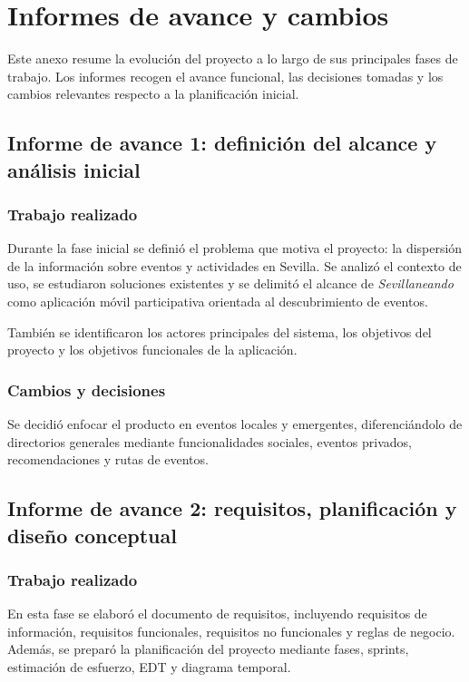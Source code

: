 \chapter{Informes de avance y cambios}

Este anexo resume la evolución del proyecto a lo largo de sus principales fases de trabajo. Los informes recogen el avance funcional, las decisiones tomadas y los cambios relevantes respecto a la planificación inicial.

\section{Informe de avance 1: definición del alcance y análisis inicial}

\subsection{Trabajo realizado}

Durante la fase inicial se definió el problema que motiva el proyecto: la dispersión de la información sobre eventos y actividades en Sevilla. Se analizó el contexto de uso, se estudiaron soluciones existentes y se delimitó el alcance de \textit{Sevillaneando} como aplicación móvil participativa orientada al descubrimiento de eventos.

También se identificaron los actores principales del sistema, los objetivos del proyecto y los objetivos funcionales de la aplicación.

\subsection{Cambios y decisiones}

Se decidió enfocar el producto en eventos locales y emergentes, diferenciándolo de directorios generales mediante funcionalidades sociales, eventos privados, recomendaciones y rutas de eventos.

\section{Informe de avance 2: requisitos, planificación y diseño conceptual}

\subsection{Trabajo realizado}

En esta fase se elaboró el documento de requisitos, incluyendo requisitos de información, requisitos funcionales, requisitos no funcionales y reglas de negocio. Además, se preparó la planificación del proyecto mediante fases, sprints, estimación de esfuerzo, EDT y diagrama temporal.

